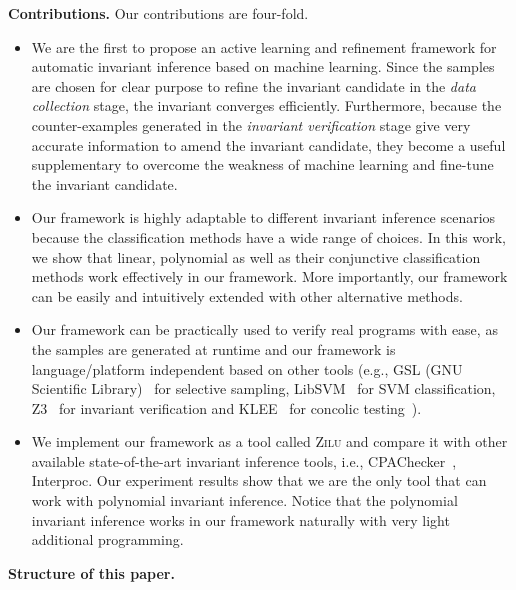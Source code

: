 \medskip\noindent
\textbf{Contributions.}
Our contributions are four-fold.
\begin{itemize}
    \item
    We are the first to propose an active learning and refinement framework
    for automatic invariant inference based on machine learning.
    Since the samples are chosen for clear purpose
    to refine the invariant candidate in the \emph{data collection} stage,
    the invariant converges efficiently.
    Furthermore, because the counter-examples generated in the \emph{invariant verification} stage
    give very accurate information to amend the invariant candidate,
    they become a useful supplementary to overcome the weakness of machine learning
    and fine-tune the invariant candidate.
    \item
    Our framework is highly adaptable to different invariant inference scenarios
    because the classification methods have a wide range of choices.
    In this work, we show that linear, polynomial as well as
    their conjunctive classification methods work effectively in our framework.
    More importantly, our framework can be easily and intuitively extended with other alternative methods.
    \item
    Our framework can be practically used to verify real programs with ease,
    as the samples are generated at runtime
    and our framework is language/platform independent based on other tools
    (e.g., GSL (GNU Scientific Library)~\cite{gough2009gnu} for selective sampling,
    LibSVM~\cite{chang2011libsvm} for SVM classification,
    Z3~\cite{de2008z3} for invariant verification
    and KLEE~\cite{cadar2008klee} for concolic testing~\cite{sen2007concolic}).
    \item
    We implement our framework as a tool called \textsc{Zilu}
    and compare it with other available state-of-the-art invariant inference tools,
    i.e., CPAChecker~\cite{beyer2011cpachecker}, Interproc.
    Our experiment results show that
    we are the only tool that can work with polynomial invariant inference.
    Notice that the polynomial invariant inference works in our framework
    naturally with very light additional programming.
\end{itemize}

\medskip\noindent
\textbf{Structure of this paper.}

